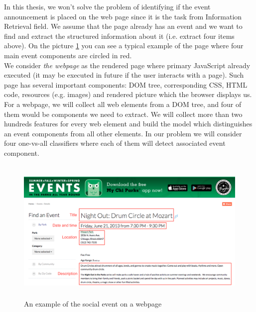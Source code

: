 In this thesis, we won't solve the problem of identifying if the event announcement is placed on the web page since it is the task from Information Retrieval field. We assume that the page already has an event and we want to find and extract the structured information about it (i.e. extract four items above). On the picture \ref{fig:webevent} you can see a typical example of the page where four main event components are circled in red.\\

We consider \textit{the webpage} as the rendered page where primary JavaScript already executed (it may be executed in future if the user interacts with a page). Such page has several important components: DOM tree, corresponding CSS, HTML code, resources (e.g. images) and rendered picture which the browser displays us. \\

For a webpage, we will collect all web elements from a DOM tree, and four of them would be components we need to extract. We will collect more than two hundreds features for every web element and build the model which distinguishes an event components from all other elements. In our problem we will consider four one-vs-all classifiers where each of them will detect associated event component. 

\begin{figure}[h]
\begin{center}
\includegraphics[height=7cm]{figures02/event_example}
\caption{An example of the social event on a webpage}
\label{fig:webevent}
\end{center}
\end{figure}


